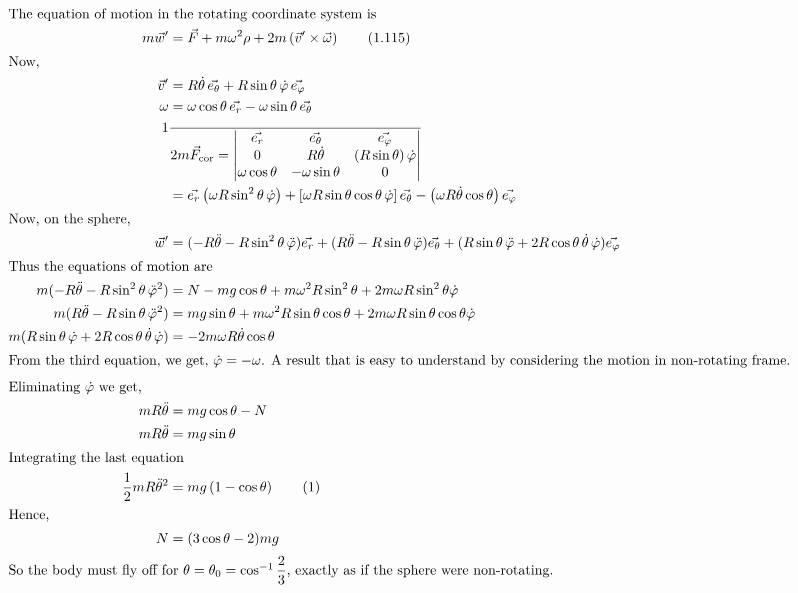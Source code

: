 \begin{solution}
    \begin{align*}
        \intertext{The equation of motion in the rotating coordinate system is}
        m\vec{w}' &= \vec{F} + m\omega^2 \rho + 2m\left(\vec{v}' \times \vec{\omega}\right) \tag{1.115}\\
        \intertext{Now,}
        \vec{v}' &= R\dot{\theta} \, \vec{e_\theta} + R \sin{\theta} \, \dot{\varphi} \, \vec{e_\varphi}\\
        \omega &= \omega \cos{\theta} \, \vec{e_r} - \omega \sin{\theta} \, \vec{e_\theta}\\
        1 &\over2m\vec{F}_{\text{cor}} = 
        \begin{vmatrix}
            \vec{e_r} & \vec{e_\theta} & \vec{e_\varphi} \\
            0 & R\dot{\theta} & \left(R\sin{\theta}\right)\dot{\varphi} \\
            \omega \cos{\theta} & -\omega \sin{\theta} & 0
        \end{vmatrix}\\ 
        &= \vec{e_r}\left(\omega R \sin^2{\theta} \, \dot{\varphi}\right) 
        + \left[\omega R \sin{\theta} \cos{\theta} \, \dot{\varphi}\right]\vec{e_\theta} 
        - \left(\omega R \dot{\theta} \cos{\theta}\right) \vec{e_\varphi}\\
        \intertext{Now, on the sphere,}
        \vec{w}' &= (-R \ddot{\theta} - R \sin^2{\theta} \, \ddot{\varphi}) \vec{e_r} 
        + (R \ddot{\theta} - R \sin{\theta} \, \ddot{\varphi}) \vec{e_\theta}
        + (R \sin{\theta} \, \ddot{\varphi} + 2R \cos{\theta} \, \dot{\theta} \, \dot{\varphi}) \vec{e_\varphi}\\
        \intertext{Thus the equations of motion are}
        m(-R \ddot{\theta} - R \sin^2{\theta} \, \ddot{\varphi}^2) &= N - mg \cos{\theta} + m \omega^2 R \sin^2{\theta} + 2m \omega R \sin^2{\theta} \dot{\varphi}\\
        m(R \ddot{\theta} - R \sin{\theta} \, \ddot{\varphi}^2) &= mg \sin{\theta} + m \omega^2 R \sin{\theta} \cos{\theta} + 2m \omega R \sin{\theta} \cos{\theta} \dot{\varphi}\\
        m(R \sin{\theta} \, \dot{\varphi} + 2R \cos{\theta} \, \dot{\theta} \, \dot{\varphi}) &= -2 m \omega R \dot{\theta} \cos{\theta}\\
        \intertext{From the third equation, we get, \(\dot{\varphi} = -\omega\). A result that is easy to understand by considering the motion in non-rotating frame.}
        \intertext{Eliminating \(\dot{\varphi}\) we get,}
        mR \ddot{\theta} &= mg \cos{\theta} - N\\
        mR\ddot{\theta} &= mg \sin{\theta}\\
        \intertext{Integrating the last equation}
        \dfrac{1}{2} mR \ddot{\theta}^2 &= mg \left(1 - \cos{\theta}\right) \tag{1}\\
        \intertext{Hence,}
        N &= (3 \cos{\theta} - 2)mg\\
        \intertext{So the body must fly off for \(\theta = \theta_0 = \cos^{-1}\dfrac{2}{3}\), exactly as if the sphere were non-rotating.}
        \end{align*}
\end{solution}